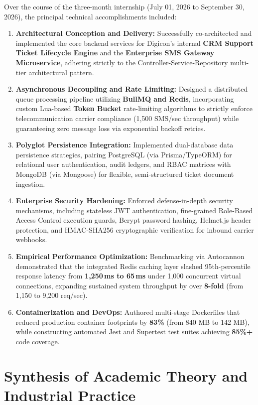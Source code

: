 Over the course of the three-month internship (July 01, 2026 to September 30, 2026), the principal technical accomplishments included:
\begin{enumerate}
    \item \textbf{Architectural Conception and Delivery:} Successfully co-architected and implemented the core backend services for Digicon's internal \textbf{CRM Support Ticket Lifecycle Engine} and the \textbf{Enterprise SMS Gateway Microservice}, adhering strictly to the Controller-Service-Repository multi-tier architectural pattern.
    \item \textbf{Asynchronous Decoupling and Rate Limiting:} Designed a distributed queue processing pipeline utilizing \textbf{BullMQ and Redis}, incorporating custom Lua-based \textbf{Token Bucket} rate-limiting algorithms to strictly enforce telecommunication carrier compliance (1,500 SMS/sec throughput) while guaranteeing zero message loss via exponential backoff retries.
    \item \textbf{Polyglot Persistence Integration:} Implemented dual-database data persistence strategies, pairing PostgreSQL (via Prisma/TypeORM) for relational user authentication, audit ledgers, and RBAC matrices with MongoDB (via Mongoose) for flexible, semi-structured ticket document ingestion.
    \item \textbf{Enterprise Security Hardening:} Enforced defense-in-depth security mechanisms, including stateless JWT authentication, fine-grained Role-Based Access Control execution guards, Bcrypt password hashing, Helmet.js header protection, and HMAC-SHA256 cryptographic verification for inbound carrier webhooks.
    \item \textbf{Empirical Performance Optimization:} Benchmarking via Autocannon demonstrated that the integrated Redis caching layer slashed 95th-percentile response latency from \textbf{1,250\,ms to 65\,ms} under 1,000 concurrent virtual connections, expanding sustained system throughput by over \textbf{8-fold} (from 1,150 to 9,200 req/sec).
    \item \textbf{Containerization and DevOps:} Authored multi-stage Dockerfiles that reduced production container footprints by \textbf{83\%} (from 840 MB to 142 MB), while constructing automated Jest and Supertest test suites achieving \textbf{85\%+} code coverage.
\end{enumerate}

\section{Synthesis of Academic Theory and Industrial Practice}
\label{sec:conclusion_academic_synthesis}

